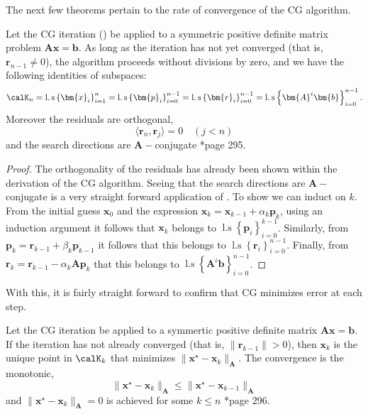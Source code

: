 The next few theorems pertain to the rate of convergence of the CG algorithm.

\begin{thm} \label{theorem: equiv-CG-spaces}
    Let the CG iteration () be applied to a symmetric positive definite matrix problem $\bm{A} \bm{x} = \bm{b}$. As long as the iteration has not yet converged (that is, $\bm{r}_{n-1} \neq 0$), the algorithm proceeds without divisions by zero, and we have the following identities of subspaces:
    \begin{equation} \label{eq: equiv-CG-spaces}
        \calK_n                                                  = \operatorname{l.s} \left\{ \bm{x}_i \right\}_{i=1}^{n} = \operatorname{l.s} \left\{ \bm{p}_i \right\}_{i=0}^{n-1} = \operatorname{l.s} \left\{ \bm{r}_i \right\}_{i=0}^{n-1} = \operatorname{l.s} \left\{ \bm{A}^{i} \bm{b} \right\}_{i=0}^{n-1}.
    \end{equation}
    Moreover the residuals are orthogonal,
    \begin{equation*}
        \langle \bm{r}_{n} , \bm{r}_{j} \rangle = 0 \quad (j<n)
    \end{equation*}
    and the search directions are $\bm{A}-$conjugate \cite{TrefethenLloydN.LloydNicholas1997Nla/}*{page 295}.
\end{thm}

\begin{proof}
    The orthogonality of the residuals has already been shown within the derivation of the CG algorithm. Seeing that the search directions are $\bm{A}-$conjugate is a very straight forward application of . To show  we can induct on $k$. From the initial guess $\bm{x}_0$ and the expression $\bm{x}_k = \bm{x}_{k-1} + \alpha_k \bm{p}_k$, using an induction argument it follows that $\bm{x}_k$ belongs to $\operatorname{l.s} \left\{ \bm{p}_i \right\}_{i=0}^{k-1}$. Similarly, from $\bm{p}_k = \bm{r}_{k-1} + \beta_k \bm{p}_{k-1}$ it follows that this belongs to $\operatorname{l.s} \left\{ \bm{r}_i \right\}_{i=0}^{n-1}$. Finally, from $\bm{r}_k = \bm{r}_{k-1} - \alpha_k \bm{A} \bm{p}_k$ that this belongs to $\operatorname{l.s} \left\{ \bm{A}^{i} \bm{b} \right\}_{i=0}^{n-1}$.
\end{proof}

With this, it is fairly straight forward to confirm that CG minimizes error at each step.

\begin{thm} \label{theorem: CG-error-min}
    Let the CG iteration be applied to a symmertic positive definite matrix $\bm{A} \bm{x} = \bm{b}$. If the iteration has not already converged (that is, $\| \bm{r}_{k-1} \| > 0 $), then $\bm{x}_{k}$ is the unique point in $\calK_{k}$ that minimizes $\| \bm{x}^{\star} - \bm{x}_{k} \|_{\bm{A}}$. The convergence is the monotonic,
    \[
        \| \bm{x}^{\star} - \bm{x}_{k} \|_{\bm{A}} \leq \| \bm{x}^{\star} - \bm{x}_{k-1} \|_{\bm{A}}
    \]
    and $\| \bm{x}^{\star} - \bm{x}_{k} \|_{\bm{A}} = 0$ is achieved for some $k \leq n$ \cite{TrefethenLloydN.LloydNicholas1997Nla/}*{page 296}.
\end{thm}

